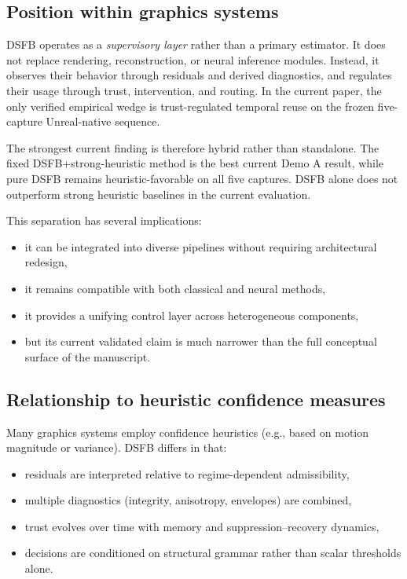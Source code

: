 \documentclass[11pt]{article}
\theoremstyle{definition}
\theoremstyle{plain}
\begin{document}
\subsection{Position within graphics systems}

DSFB operates as a \emph{supervisory layer} rather than a primary estimator. It does not replace rendering, reconstruction, or neural inference modules. Instead, it observes their behavior through residuals and derived diagnostics, and regulates their usage through trust, intervention, and routing. In the current paper, the only verified empirical wedge is trust-regulated temporal reuse on the frozen five-capture Unreal-native sequence.

The strongest current finding is therefore hybrid rather than standalone. The fixed DSFB+strong-heuristic method is the best current Demo A result, while pure DSFB remains heuristic-favorable on all five captures. DSFB alone does not outperform strong heuristic baselines in the current evaluation.

This separation has several implications:

\begin{itemize}[leftmargin=1.5em]
    \item it can be integrated into diverse pipelines without requiring architectural redesign,
    \item it remains compatible with both classical and neural methods,
    \item it provides a unifying control layer across heterogeneous components,
    \item but its current validated claim is much narrower than the full conceptual surface of the manuscript.
\end{itemize}


\subsection{Relationship to heuristic confidence measures}

Many graphics systems employ confidence heuristics (e.g., based on motion magnitude or variance). DSFB differs in that:

\begin{itemize}[leftmargin=1.5em]
    \item residuals are interpreted relative to regime-dependent admissibility,
    \item multiple diagnostics (integrity, anisotropy, envelopes) are combined,
    \item trust evolves over time with memory and suppression–recovery dynamics,
    \item decisions are conditioned on structural grammar rather than scalar thresholds alone.
\end{itemize}
\end{document}
